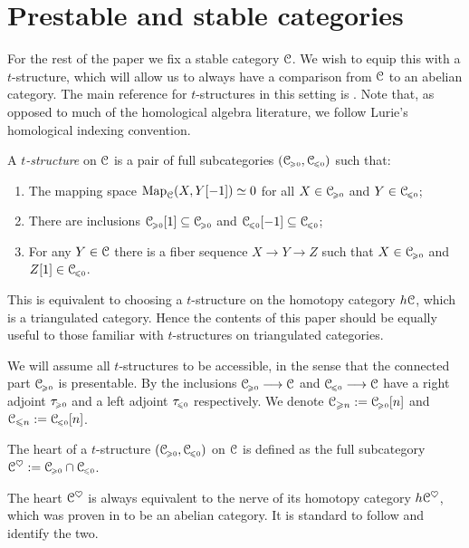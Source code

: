 
\section{Prestable and stable categories}
\label{ch4:sec:prestable-and-stable-categories}

For the rest of the paper we fix a stable category $\C$. We wish to equip this with a $t$-structure, which will allow us to always have a comparison from $\C$ to an abelian category. The main reference for $t$-structures in this setting is \cite[Sec 1.2.1]{Lurie_HA}. Note that, as opposed to much of the homological algebra literature, we follow Lurie's homological indexing convention.  

\begin{definition}
    A \emph{$t$-structure} on $\C$ is a pair of full subcategories $(\C\geqz, \C\leqz)$ such that:
    \begin{enumerate}
        \item The mapping space $\Map_\C(X,Y[-1])\simeq 0$ for all $X\in \C\geqz$ and $Y\in \C\leqz$;
        \item There are inclusions $\C\geqz[1]\subseteq \C\geqz$ and $\C\leqz[-1]\subseteq \C\leqz$;
        \item For any $Y\in \C$ there is a fiber sequence $X\to Y\to Z$ such that $X\in \C\geqz$ and $Z[1]\in \C\leqz$. 
    \end{enumerate} 
\end{definition}

This is equivalent to choosing a $t$-structure on the homotopy category $h\C$, which is a triangulated category. Hence the contents of this paper should be equally useful to those familiar with $t$-structures on triangulated categories. 

We will assume all $t$-structures to be accessible, in the sense that the connected part $\C\geqz$ is presentable. By \cite[1.2.16]{Lurie_HA} the inclusions $\C\geqz\to \C$ and $\C\leqz\to \C$ have a right adjoint $\tau\geqz$ and a left adjoint $\tau\leqz$ respectively. We denote $\C_{\geq n} := \C\geqz[n]$ and $\C_{\leq n} := \C\leqz[n]$. 

\begin{definition}
    The heart of a $t$-structure $(\C\geqz, \C\leqz)$ on $\C$ is defined as the full subcategory $\C^\heart := \C\geqz\cap\C\leqz$.
\end{definition}

The heart $\C^\heart$ is always equivalent to the nerve of its homotopy category $h\C^\heart$, which was proven in \cite{beilinson-bernstein-deligne_1983} to be an abelian category. It is standard to follow \cite[1.2.1.12]{Lurie_HA} and identify the two. 

